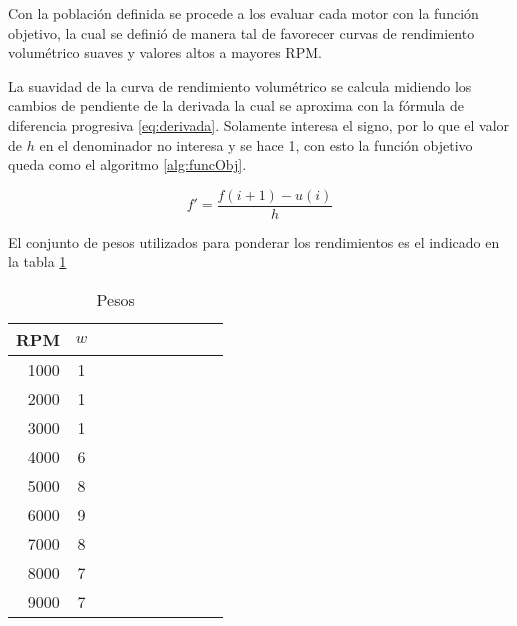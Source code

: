 Con la población definida se procede a los evaluar cada motor con la función
objetivo, la cual se definió de manera tal de favorecer curvas de rendimiento
volumétrico suaves y valores altos a mayores RPM.

La suavidad de la curva de rendimiento volumétrico se calcula midiendo los
cambios de pendiente de la derivada la cual se aproxima con la fórmula de
diferencia progresiva \ref{eq:derivada}.
%
Solamente interesa el signo, por lo que el valor de $h$ en el denominador no
interesa y se hace 1, con esto la función objetivo queda como el algoritmo
\ref{alg:funcObj}.

\begin{equation}
  f' = \frac{f(i+1) - u(i)}{h}
  \label{eq:derivada}
\end{equation}


%
%
%
%
%
%

El conjunto de pesos utilizados para ponderar los rendimientos es el indicado
en la tabla \ref{tab:pesos}

\begin{table}
  \centering
  \begin{tabular}{rccccccccc} \toprule
      RPM  & $w$ \\ \midrule
      1000 & 1 \\
      2000 & 1 \\
      3000 & 1 \\
      4000 & 6 \\
      5000 & 8 \\
      6000 & 9 \\
      7000 & 8 \\
      8000 & 7 \\
      9000 & 7 \\ \bottomrule
  \end{tabular}
  \caption{Pesos}
  \label{tab:pesos}
\end{table}



